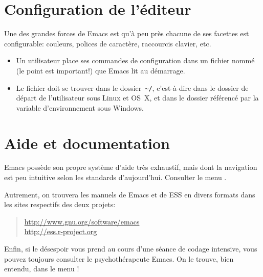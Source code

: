 \section{Configuration de l'éditeur}
\label{emacs+ess:configuration}

Une des grandes forces de Emacs est qu'à peu près chacune de ses
facettes est configurable: couleurs, polices de caractère, raccourcis
clavier, etc.

\begin{itemize}
\item Un utilisateur place ses commandes de configuration dans un
  fichier nommé  (le point est important!) que Emacs lit
  au démarrage.
\item Le fichier  doit se trouver dans le dossier
  \,\verb=~/=, c'est-à-dire dans le dossier de départ de l'utilisateur
  sous Linux et OS~X, et dans le dossier référencé par la variable
  d'environnement  sous Windows.
\end{itemize}


\section{Aide et documentation}
\label{emacs+ess:aide}

Emacs possède son propre système d'aide très exhaustif, mais dont la
navigation est peu intuitive selon les standards d'aujourd'hui.
Consulter le menu .

Autrement, on trouvera les manuels de Emacs et de ESS en divers
formats dans les sites respectifs des deux projets:
\begin{quote}
  \url{http://www.gnu.org/software/emacs} \\
  \url{http://ess.r-project.org}
\end{quote}

Enfin, si le désespoir vous prend au cours d'une séance de codage
intensive, vous pouvez toujours consulter le psychothérapeute Emacs.
On le trouve, bien entendu, dans le menu !

